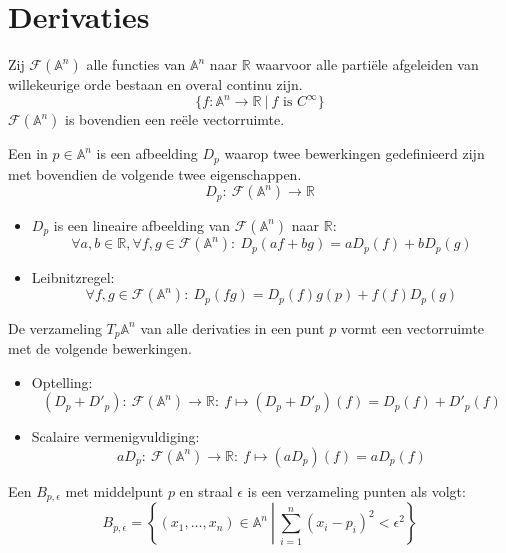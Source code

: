 \documentclass[main.tex]{subfiles}
\begin{document}
\chapter{Derivaties}
\label{cha:derivaties}

\begin{de}
  Zij $\mathcal{F}(\mathbb{A}^{n})$ alle functies van $\mathbb{A}^{n}$ naar $\mathbb{R}$ waarvoor alle parti\"ele afgeleiden van willekeurige orde bestaan en overal continu zijn.
  \[ \{ f: \mathbb{A}^{n} \rightarrow \mathbb{R} \ |\ f \text{ is } C^{\infty} \} \]
  $\mathcal{F}(\mathbb{A}^{n})$ is bovendien een re\"ele vectorruimte.
\end{de}

\begin{de}
  Een  in $p\in\mathbb{A}^{n}$ is een afbeelding $D_{p}$ waarop twee bewerkingen gedefinieerd zijn met bovendien de volgende twee eigenschappen.
  \[ D_{p}:\ \mathcal{F}(\mathbb{A}^{n}) \rightarrow \mathbb{R} \]
  \begin{itemize}
  \item $D_{p}$ is een lineaire afbeelding van $\mathcal{F}(\mathbb{A}^{n})$ naar $\mathbb{R}$:
    \[ \forall a,b \in \mathbb{R}, \forall f,g \in \mathcal{F}(\mathbb{A}^{n}):\ D_{p}(af + bg) = aD_{p}(f) + bD_{p}(g) \]
  \item Leibnitzregel: 
    \[ \forall f,g \in \mathcal{F}(\mathbb{A}^{n}):\ D_{p}(fg) = D_{p}(f)g(p) + f(f)D_{p}(g)\]
  \end{itemize}
\end{de}

\begin{ei}
  De verzameling $T_{p}\mathbb{A}^{n}$ van alle derivaties in een punt $p$ vormt een vectorruimte met de volgende bewerkingen.
  \begin{itemize}
  \item Optelling:
    \[ (D_{p} + D'_{p}):\ \mathcal{F}(\mathbb{A}^{n}) \rightarrow \mathbb{R}:\ f \mapsto (D_{p} + D'_{p})(f) = D_{p}(f) + D'_{p}(f)\]
  \item Scalaire vermenigvuldiging:
    \[ aD_{p}:\ \mathcal{F}(\mathbb{A}^{n}) \rightarrow \mathbb{R}:\ f \mapsto (aD_{p})(f) = aD_{p}(f)\]
  \end{itemize}
\end{ei}

\begin{de}
  Een  $B_{p,\epsilon}$ met middelpunt $p$ en straal $\epsilon$ is een verzameling punten als volgt:
  \[ B_{p,\epsilon} = \left\{ (x_{1},\dotsc ,x_{n})\in \mathbb{A}^{n}\ \left|\ \sum_{i=1}^{n}(x_{i}-p_{i})^{2} < \epsilon^{2} \right.\right\}\]
\end{de}
\end{document}
